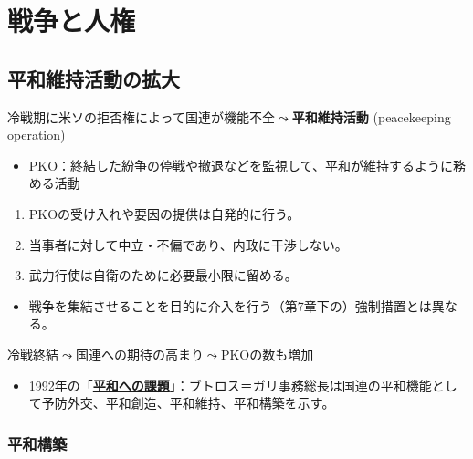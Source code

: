 \documentclass[
  xelatex,
  ja=standard]{bxjsarticle}
\providecommand{\tightlist}{%
  \setlength{\itemsep}{0pt}\setlength{\parskip}{0pt}}\usepackage{longtable,booktabs,array}
\begin{document}
\hypertarget{ux6226ux4e89ux3068ux4ebaux6a29}{%
\section{戦争と人権}\label{ux6226ux4e89ux3068ux4ebaux6a29}}

\hypertarget{ux5e73ux548cux7dadux6301ux6d3bux52d5ux306eux62e1ux5927}{%
\subsection{平和維持活動の拡大}\label{ux5e73ux548cux7dadux6301ux6d3bux52d5ux306eux62e1ux5927}}

冷戦期に米ソの拒否権によって国連が機能不全\(\leadsto\)\textbf{平和維持活動}
(peacekeeping operation)

\begin{itemize}
\tightlist
\item
  PKO：終結した紛争の停戦や撤退などを監視して、平和が維持するように務める活動
\end{itemize}

\begin{enumerate}
\def\labelenumi{\arabic{enumi}.}
\tightlist
\item
  PKOの受け入れや要因の提供は自発的に行う。
\item
  当事者に対して中立・不偏であり、内政に干渉しない。\\
\item
  武力行使は自衛のために必要最小限に留める。
\end{enumerate}

\begin{itemize}
\tightlist
\item
  戦争を集結させることを目的に介入を行う（第7章下の）強制措置とは異なる。
\end{itemize}

冷戦終結\(\leadsto\)国連への期待の高まり\(\leadsto\)PKOの数も増加

\begin{itemize}
\tightlist
\item
  1992年の「\href{https://www.unic.or.jp/files/peace.pdf}{\textbf{平和への課題}}」：ブトロス＝ガリ事務総長は国連の平和機能として予防外交、平和創造、平和維持、平和構築を示す。
\end{itemize}

\hypertarget{ux5e73ux548cux69cbux7bc9}{%
\subsubsection{平和構築}\label{ux5e73ux548cux69cbux7bc9}}
\end{document}
